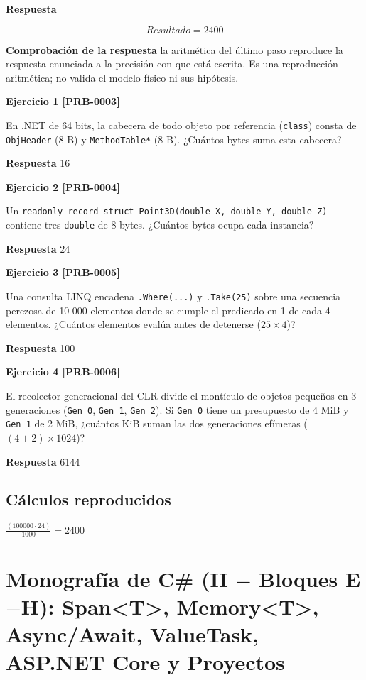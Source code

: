 \documentclass{book}
\begin{document}
\noindent\textbf{Respuesta}

\[
Resultado = 2400
\]

\noindent\textbf{Comprobación de la respuesta} la aritmética del último paso reproduce la respuesta enunciada a la precisión con que está escrita. Es una reproducción aritmética; no valida el modelo físico ni sus hipótesis.

\noindent\textbf{Ejercicio 1 [PRB-0003]}

En .NET de 64 bits, la cabecera de todo objeto por referencia (\texttt{class}) consta de \texttt{ObjHeader} (8 B) y \texttt{MethodTable*} (8 B). ¿Cuántos bytes suma esta cabecera?

\noindent\textbf{Respuesta} 16

\noindent\textbf{Ejercicio 2 [PRB-0004]}

Un \texttt{readonly record struct Point3D(double X, double Y, double Z)} contiene tres \texttt{double} de 8 bytes. ¿Cuántos bytes ocupa cada instancia?

\noindent\textbf{Respuesta} 24

\noindent\textbf{Ejercicio 3 [PRB-0005]}

Una consulta LINQ encadena \texttt{.Where(...)} y \texttt{.Take(25)} sobre una secuencia perezosa de 10 000 elementos donde se cumple el predicado en 1 de cada 4 elementos. ¿Cuántos elementos evalúa antes de detenerse (\(25 \times 4\))?

\noindent\textbf{Respuesta} 100

\noindent\textbf{Ejercicio 4 [PRB-0006]}

El recolector generacional del CLR divide el montículo de objetos pequeños en 3 generaciones (\texttt{Gen 0}, \texttt{Gen 1}, \texttt{Gen 2}). Si \texttt{Gen 0} tiene un presupuesto de 4 MiB y \texttt{Gen 1} de 2 MiB, ¿cuántos KiB suman las dos generaciones efímeras (\((4 + 2) \times 1024\))?

\noindent\textbf{Respuesta} 6144

\subsection*{Cálculos reproducidos}

\(\frac{\left(100000\cdot 24\right)}{1000} = 2400\)

\section{Monografía de C\# (II \(-\) Bloques E\(-\)H): Span<T>, Memory<T>, Async/Await, ValueTask, ASP.NET Core y Proyectos}
\end{document}
